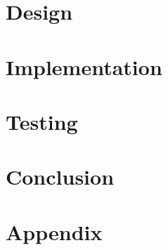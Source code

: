 \documentclass[a4paper,10pt,titlepage]{report}
\begin{document}
\section{Design}

\section{Implementation}

\section{Testing}

\section{Conclusion}

\section{Appendix}
\end{document}
